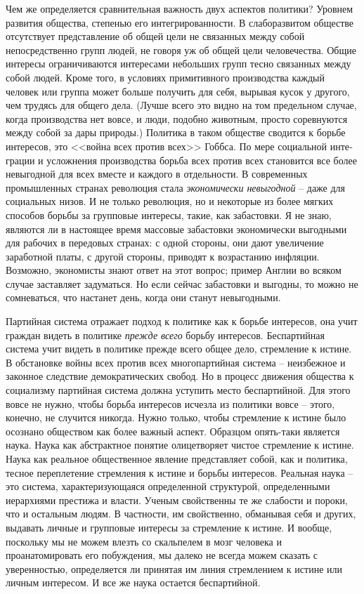 \documentclass{book}
\begin{document}
Чем же определяется сравнительная важность двух аспектов политики? Уровнем развития общества, степенью его интегрированности. В слаборазвитом обществе отсутствует представ­ление об общей цели не связанных между собой непосредствен­но групп людей, не говоря уж об общей цели человечества. Общие интересы ограничиваются интересами небольших групп тесно связанных между собой людей. Кроме того, в условиях примитивного производства каждый человек или группа может больше получить для себя, вырывая кусок у другого, чем тру­дясь для общего дела. (Лучше всего это видно на том предель­ном случае, когда производства нет вовсе, и люди, подобно животным, просто соревнуются между собой за дары природы.) Политика в таком обществе сводится к борьбе интересов, это <<война всех против всех>> Гоббса. По мере социальной инте­грации и усложнения производства борьба всех против всех становится все более невыгодной для всех вместе и каждого в отдельности. В современных промышленных странах революция стала \textit{экономически 
невыгодной} --  
даже для со­циальных низов. И не только революция, но и некоторые из более мягких способов борьбы за групповые интересы, такие, как забастовки. Я не знаю, являются ли в настоящее время массовые забастовки экономически выгодными для рабочих в передовых странах: с одной стороны, они дают увеличение заработной платы, с другой стороны, приводят к возрастанию инфляции. Возможно, экономисты знают ответ на этот вопрос; пример Англии во всяком случае заставляет задуматься. Но если сейчас забастовки и выгодны, то можно не сомневаться, что настанет день, когда они станут невыгодными.

Партийная система отражает подход к политике как к борь­бе интересов, она учит граждан видеть в политике \textit{прежде всего} борьбу интересов. Беспартийная система учит видеть в политике прежде всего общее дело, стремление к истине. В обстанов­ке войны всех против всех многопартийная система -- неиз­бежное и законное следствие демократических свобод. Но в процесс движения общества к социализму партийная система должна уступить место беспартийной. Для этого вовсе не нуж­но, чтобы борьба интересов исчезла из политики вовсе -- этого, конечно, не случится никогда. Нужно только, чтобы стремле­ние к истине было осознано обществом как более важный аспект. Образцом опять-таки является наука. Наука как абстрактное понятие олицетворяет чистое стремление к истине. Наука как реальное общественное явление представляет собой, как и политика, тесное переплетение стремления к истине и борьбы интересов. Реальная наука -- это система, характеризующаяся определенной структурой, определенными иерархиями престижа и власти. 
Ученым 
свойственны те же слабости и пороки, что и остальным людям. В частности, им свойственно, обманывая себя и других, выдавать личные и групповые интересы за стремление к истине. И вообще, поскольку мы не можем влезть со скальпелем в мозг человека и проанатомировать его побуждения, мы далеко не всегда можем сказать с уверенностью, определяется ли принятая им линия стремле­нием к истине или личным интересом. И все же наука остает­ся беспартийной.
\end{document}
